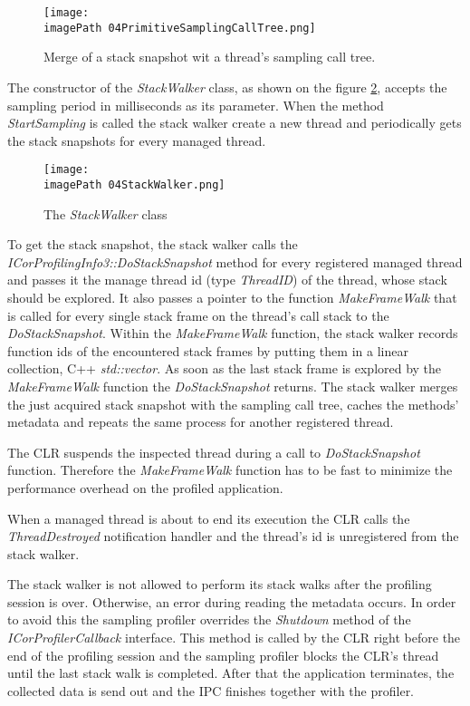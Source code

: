 \begin{figure}
	\centering
		\texttt{[image: \\imagePath 04PrimitiveSamplingCallTree.png]}
		\caption{ Merge of a stack snapshot wit a thread's sampling call tree. }
	\label{fig:04PrimitiveSamplingCallTree}
\end{figure}

The constructor of the \textit{StackWalker} class, as shown on the figure \ref{fig:04StackWalker}, accepts the sampling period in milliseconds as its parameter. When the method \textit{StartSampling} is called the stack walker create a new thread and periodically gets the stack snapshots for every managed thread.

\begin{figure}
	\centering
		\texttt{[image: \\imagePath 04StackWalker.png]}
		\caption{ The \textit{StackWalker} class}
	\label{fig:04StackWalker}
\end{figure}


To get the stack snapshot, the stack walker calls the \textit{ICorProfilingInfo3::DoStackSnapshot} method for every registered managed thread and passes it the manage thread id (type \textit{ThreadID}) of the thread, whose stack should be explored. It also passes a pointer to the function \textit{MakeFrameWalk} that is called for every single stack frame on the thread's call stack to the \textit{DoStackSnapshot}. Within the \textit{MakeFrameWalk} function, the stack walker records function ids of the encountered stack frames by putting them in a linear collection, C++ \textit{std::vector}. As soon as the last stack frame is explored by the \textit{MakeFrameWalk} function the \textit{DoStackSnapshot} returns. The stack walker merges the just acquired stack snapshot with the sampling call tree, caches the methods' metadata and repeats the same process for another registered thread. 

The CLR suspends the inspected thread during a call to \textit{DoStackSnapshot} function. Therefore the \textit{MakeFrameWalk} function has to be fast to minimize the performance overhead on the profiled application.

When a managed thread is about to end its execution the CLR calls the \textit{ThreadDestroyed} notification handler and the thread's id is unregistered from the stack walker.

The stack walker is not allowed to perform its stack walks after the profiling session is over. Otherwise, an error during reading the metadata occurs. In order to avoid this the sampling profiler overrides the \textit{Shutdown} method of the \textit{ICorProfilerCallback} interface. This method is called by the CLR right before the end of the profiling session and the sampling profiler blocks the CLR's thread until the last stack walk is completed. After that the application terminates, the collected data is send out and the IPC finishes together with the profiler.

